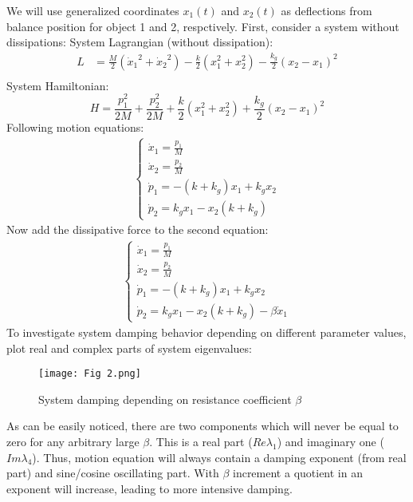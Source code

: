 \documentclass[]{article}
\begin{document}
We will use generalized coordinates $x_1(t)$ and $x_2(t)$ as deflections from balance position for  object 1 and 2, respctively.\newline
First, consider a system without dissipations: 
System Lagrangian (without dissipation):\newline
\begin{align*}
L &= \frac{M}{2}\left({\dot x_1}^2 + {\dot x_2}^2\right) - \frac{k}{2}\left(x_1^2 + x_2^2\right) - \frac{k_g}{2}\left(x_2-x_1\right)^2\\
\end{align*}
System Hamiltonian:
\begin{equation}
H = \frac{p_1^2}{2M} + \frac{p_2^2}{2M} + \frac{k}{2}\left(x_1^2 + x_2^2\right) + \frac{k_g}{2}\left(x_2 - x_1\right)^2
\end{equation}
Following motion equations:\newline
\begin{align*}
	\begin{cases}
		\dot x_1 = \frac{p_1}{M}
		\\
		\dot x_2 = \frac{p_2}{M}
		\\
		\dot p_1 = -(k+k_g)x_1 + k_g x_2
		\\
		\dot p_2 = k_gx_1 - x_2(k+k_g)
	\end{cases}
\end{align*}
Now add the dissipative force to the second equation:
\begin{align*}
	\begin{cases}
		\dot x_1 = \frac{p_1}{M}
		\\
		\dot x_2 = \frac{p_2}{M}
		\\
		\dot p_1 = -(k+k_g)x_1 + k_g x_2
		\\
		\dot p_2 = k_gx_1 - x_2(k+k_g) - \beta \dot x_1
	\end{cases}
\end{align*}
To investigate system damping behavior depending on different parameter values, plot real and complex parts of system eigenvalues:
\begin{figure}[h]
	\centering
	\texttt{[image: Fig 2.png]}
	\caption{System damping depending on resistance coefficient $\beta$}
\end{figure}\newline

As can be easily noticed, there are two components which will never be equal to zero for any arbitrary large $\beta$. This is a real part ($Re \lambda_1$) and imaginary one ($Im \lambda_4$). Thus, motion equation will always contain a damping exponent (from real part) and sine/cosine oscillating part. With $\beta$ increment a quotient in an exponent will increase, leading to more intensive damping.
\end{document}
